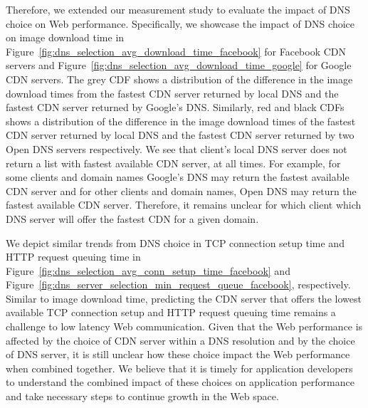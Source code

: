 \documentclass{llncs}
\begin{document}
Therefore, we extended our measurement study to evaluate the impact of DNS choice on Web performance.
Specifically, we showcase the impact of DNS choice on image download time in Figure~\ref{fig:dns_selection_avg_download_time_facebook} for Facebook CDN servers and Figure~\ref{fig:dns_selection_avg_download_time_google} for Google CDN servers.
The grey CDF shows a distribution of the difference in the image download times from the fastest CDN server returned by local DNS and the fastest CDN server returned by Google's DNS.
Similarly, red and black CDFs shows a distribution of the difference in the image download times of the fastest CDN server returned by local DNS and the fastest CDN server returned by two Open DNS servers respectively.
We see that client's local DNS server does not return a list with fastest available CDN server, at all times.
For example, for some clients and domain names Google's DNS may return the fastest available CDN server and for other clients and domain names, Open DNS may return the fastest available CDN server.
Therefore, it remains unclear for which client which DNS server will offer the fastest CDN for a given domain. 

We depict similar trends from DNS choice in TCP connection setup time and HTTP request queuing time in Figure~\ref{fig:dns_selection_avg_conn_setup_time_facebook} and Figure~\ref{fig:dns_server_selection_min_request_queue_facebook}, respectively.
Similar to image download time, predicting the CDN server that offers the lowest available TCP connection setup and HTTP request queuing time remains a challenge to low latency Web communication.
Given that the Web performance is affected by the choice of CDN server within a DNS resolution and by the choice of DNS server, it is still unclear how these choice impact the Web performance when combined together.
We believe that it is timely for application developers to understand the combined impact of these choices on application performance and take necessary steps to continue growth in the Web space. 
\end{document}
